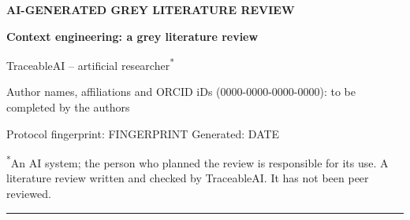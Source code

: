 \documentclass[10pt,a4paper]{article}
\begin{document}
\begin{center}
  {\sffamily\bfseries\scriptsize\color{gray} AI-GENERATED GREY LITERATURE REVIEW\par}
  \vspace{4pt}
  {\rmfamily\LARGE\bfseries Context engineering: a grey literature review\par}
  \vspace{8pt}
  {\large TraceableAI – artificial researcher\textsuperscript{*}\par}
  \vspace{4pt}
  {\sffamily\small\color{greyText} Author names, affiliations and ORCID iDs (0000-{}0000-{}0000-{}0000): to be completed by the authors\par}
  \vspace{4pt}
  {\ttfamily\scriptsize\color{gray} Protocol fingerprint: FINGERPRINT \textbar{} Generated: DATE\par}
\end{center}
{\footnotesize\noindent\textsuperscript{*}An AI system; the person who planned the review is responsible for its use. A literature review written and checked by TraceableAI\@. It has not been peer reviewed.\par}
{\color{lightgray}\hrule}

\begin{abstract}
One source keeps running summaries.
\end{abstract}
\vspace{12pt}
\end{document}
